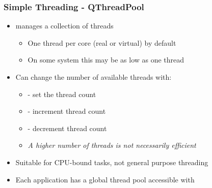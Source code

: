\begin{slide}
\frametitle{Simple Threading - QThreadPool}

\begin{itemize}
\item {} manages a collection of threads
  \begin{itemize}
  \item One thread per core (real or virtual) by default
  \item On some system this may be as low as one thread
  \end{itemize}
\item Can change the number of available threads with:
  \begin{itemize}
  \item {} - set the thread count
  \item {} - increment thread count
  \item {} - decrement thread count
  \item \textit{A higher number of threads is not necessarily efficient}
  \end{itemize}
\item Suitable for CPU-bound tasks, not general purpose threading
\item Each application has a global thread pool accessible with
\end{itemize}

\end{slide}



